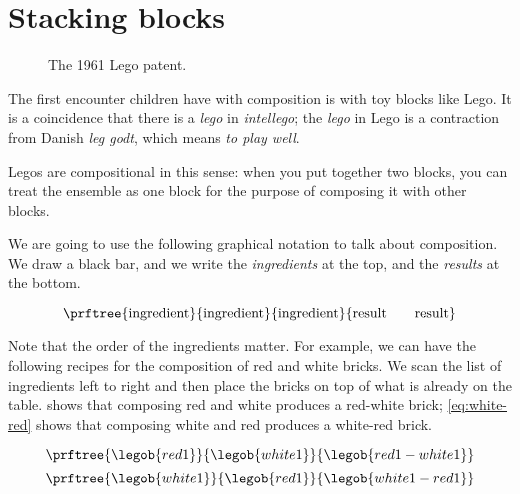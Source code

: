 

\section{Stacking blocks}

\begin{figure*}[p]
  \centering
%
  \caption{The 1961 Lego patent.}
\end{figure*}


The first encounter children have with composition is with toy blocks like Lego. It is a coincidence that there is a \emph{lego} in \emph{intellego}; the \emph{lego} in Lego is a contraction from Danish \emph{leg godt}, which means \emph{to play well}.

Legos are compositional in this sense: when you put together two blocks, you can treat the ensemble as one block for the purpose of composing it with other blocks.

We are going to use the following graphical notation to talk about composition.
We draw a black bar, and we write the \emph{ingredients} at the top, and the \emph{results} at the bottom.

\begin{equation}
\prftree{
    \text{ingredient}
}{
    \text{ingredient}
}{
    \text{ingredient}
}{
    \text{result} \quad \quad \text{result}
}
\end{equation}

Note that the order of the ingredients matter.
For example, we can have the following recipes for the composition of red and white bricks.
We scan the list of ingredients left to right and then place the bricks on top of what is already on the table.
 shows that composing red and white produces a red-white brick;
\cref{eq:white-red} shows that composing white and red produces a white-red brick.

\begin{equation}\label{eq:red-white}
\prftree{\legob{red1}}{\legob{white1}}{\legob{red1-white1}}
\end{equation}
%
\begin{equation}\label{eq:white-red}
\prftree{\legob{white1}}{\legob{red1}}{\legob{white1-red1}}
\end{equation}

